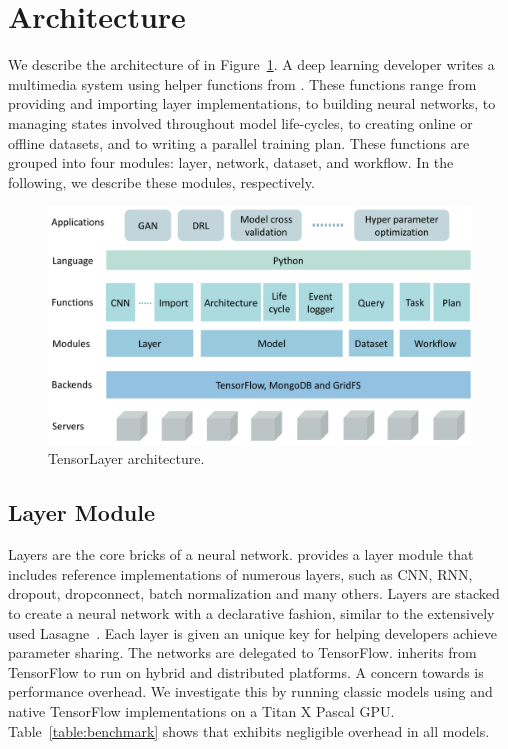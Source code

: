 \section{Architecture}

We describe the architecture of \tl in Figure~\ref{fig:architecture}.
A deep learning developer 
writes a multimedia system using helper functions from \tl.
These functions range from providing and importing layer implementations,
to building neural networks, to managing states involved throughout model life-cycles, 
to creating online or offline datasets, and to writing a parallel training plan.  
These functions are grouped into four modules: layer, network, dataset, and workflow. 
In the following, we describe these modules, respectively.

\begin{figure}
	\centering %
	\includegraphics[scale=0.19, trim={0.3cm 0.5cm 0.3cm 0.3cm},clip]{figures/architecture.png}
	\caption{TensorLayer architecture.}
	\label{fig:architecture}
\end{figure} 

\subsection{Layer Module}

Layers are the core bricks of a neural network.
\tl provides a layer module that includes reference implementations of numerous layers, 
such as CNN, RNN, dropout, dropconnect, batch normalization and many others.
Layers are stacked to create a neural network with a declarative fashion, similar to
the extensively used Lasagne~\cite{lasagne}.
Each layer is given an unique key for  
helping developers achieve parameter sharing.
The networks are delegated to TensorFlow.
\tl inherits from TensorFlow to run on hybrid and distributed platforms. 
A concern towards \tl is performance overhead. We investigate this by
running classic models \cite{benchmark} using \tl and native TensorFlow implementations
on a Titan X Pascal GPU. Table~\ref{table:benchmark} shows that \tl exhibits negligible overhead in all models.

